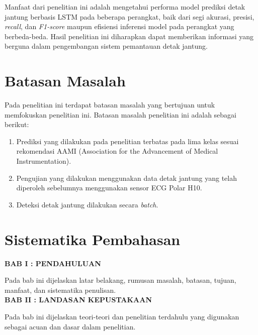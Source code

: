 Manfaat dari penelitian ini adalah mengetahui performa model prediksi detak jantung berbasis LSTM pada beberapa perangkat, baik dari segi akurasi, presisi, \emph{recall}, dan \emph{F1-score} maupun efisiensi inferensi model pada perangkat yang berbeda-beda. Hasil penelitian ini diharapkan dapat memberikan informasi yang berguna dalam pengembangan sistem pemantauan detak jantung.


\section{Batasan Masalah}

Pada penelitian ini terdapat batasan masalah yang bertujuan untuk memfokuskan penelitian ini. Batasan masalah penelitian ini adalah sebagai berikut:
\begin{enumerate}
  \item Prediksi yang dilakukan pada penelitian terbatas pada lima kelas sesuai rekomendasi AAMI (Association for the Advancement of Medical Instrumentation).
  \item Pengujian yang dilakukan menggunakan data detak jantung yang telah diperoleh sebelumnya menggunakan sensor ECG Polar H10.
  \item Deteksi detak jantung dilakukan secara \textit{batch}.
\end{enumerate}




\section{Sistematika Pembahasan}
\noindent
\textbf{BAB I : PENDAHULUAN}

Pada bab ini dijelaskan latar belakang, rumusan masalah, batasan,
tujuan, manfaat,  dan sistematika penulisan.\\

\noindent
\textbf{BAB II : LANDASAN KEPUSTAKAAN}

Pada bab ini dijelaskan teori-teori dan penelitian terdahulu yang
digunakan sebagai acuan dan dasar dalam penelitian.\\

